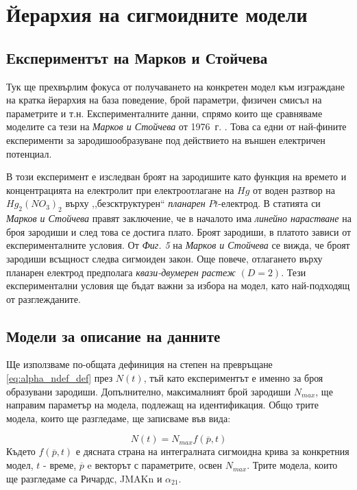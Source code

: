 \section{Йерархия на сигмоидните модели}
\subsection{Експериментът на Марков и Стойчева}
Тук ще прехвърлим фокуса от получаването на конкретен модел към изграждане на кратка йерархия на база поведение, брой параметри, физичен смисъл на параметрите и т.н. Експерименталните данни, спрямо които ще сравняваме моделите са тези на \textit{Марков и Стойчева} от 1976~г. \cite{Markov1976}. Това са едни от най-фините експерименти за зародишообразуване под действието на външен електричен потенциал.

В този експеримент е изследван броят на зародишите като функция на времето и  концентрацията на електролит при електроотлагане на $Hg$ от воден разтвор на $Hg_2(NO_3)_2$ върху ,,безсктруктурен`` \textit{планарен} $Pt$-електрод. В статията си \textit{Марков и Стойчева} правят заключение, че в началото има \textit{линейно нарастване} на броя зародиши и след това се достига плато. Броят зародиши, в платото зависи от експерименталните условия. От \textit{Фиг. 5} на \textit{Марков и Стойчева} се вижда, че броят зародиши всъщност следва сигмоиден закон. Още повече, отлагането върху планарен електрод предполага \textit{квази-двумерен растеж} $(D=2)$. Тези експериментални условия ще бъдат важни за избора на модел, като най-подходящ от разглежданите.

\subsection{Модели за описание на данните}
Ще използваме по-общата дефиниция на степен на превръщане \autoref{eq:alpha_ndef_def} през $N(t)$, тъй като експериментът е именно за броя образувани зародиши. Допълнително, максималният брой зародиши $N_{max}$, ще направим параметър на модела, подлежащ на идентификация. Общо трите модела, които ще разгледаме, ще записваме във вида:

\begin{equation*}
    N(t) = N_{max} f(\overline{p}, t)
\end{equation*}
Където $f(\overline{p}, t)$ е дясната страна на интегралната сигмоидна крива за конкретния модел, $t$ - време,  $\overline{p}$ e векторът с параметрите, освен $N_{max}$.
Трите модела, които ще разгледаме са Ричардс, JMAKn и $\alpha_{21}$.
